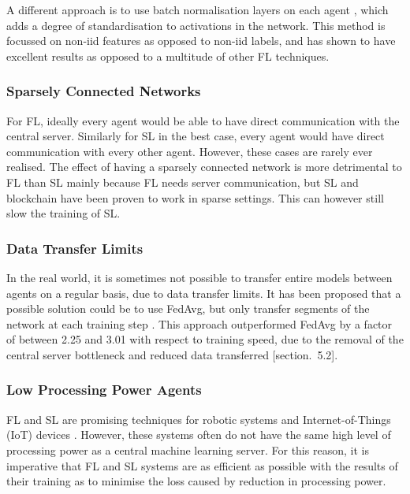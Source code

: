 A different approach is to use batch normalisation layers on each agent \cite{fedbn}, which adds a degree of standardisation to activations in the network. This method is focussed on non-iid features as opposed to non-iid labels, and has shown to have excellent results as opposed to a multitude of other FL techniques.

\subsubsection{Sparsely Connected Networks}
For FL, ideally every agent would be able to have direct communication with the central server. Similarly for SL in the best case, every agent would have direct communication with every other agent. However, these cases are rarely ever realised. The effect of having a sparsely connected network is more detrimental to FL than SL mainly because FL needs server communication, but SL and blockchain have been proven to work in sparse settings. This can however still slow the training of SL.

\subsubsection{Data Transfer Limits}
In the real world, it is sometimes not possible to transfer entire models between agents on a regular basis, due to data transfer limits. It has been proposed that a possible solution could be to use FedAvg, but only transfer segments of the network at each training step \cite{gossip_learning}. This approach outperformed FedAvg by a factor of between 2.25 and 3.01 with respect to training speed, due to the removal of the central server bottleneck and reduced data transferred \cite{gossip_learning}[section.~5.2].

\subsubsection{Low Processing Power Agents}
FL and SL are promising techniques for robotic systems \cite{fed_in_robotics} and Internet-of-Things (IoT) devices \cite{fed_iot}. However, these systems often do not have the same high level of processing power as a central machine learning server. For this reason, it is imperative that FL and SL systems are as efficient as possible with the results of their training as to minimise the loss caused by reduction in processing power.

